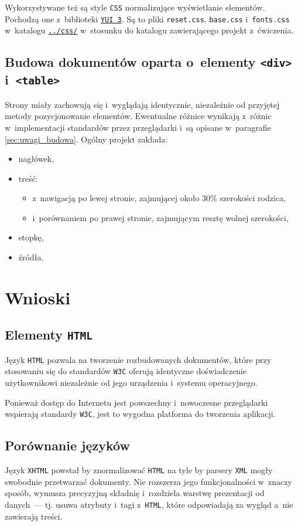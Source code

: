 \documentclass[10pt,a4paper]{article}
\newcommand{\f}[1]{\texttt{#1}}
\begin{document}
Wykorzystywane też są style \f{CSS} normalizujące wyświetlanie elementów.
Pochodzą one z~biblioteki \f{\href{http://yuilibrary.com/}{YUI 3}}. Są to pliki
\f{reset.css}, \f{base.css} i~\f{fonts.css} w~katalogu
\f{\href{https://github.com/student-tomasz/pi-laboratoria/tree/master/css}{../css/}}
w~stosunku do katalogu zawierającego projekt z~ćwiczenia.

\subsection{Budowa dokumentów oparta o~elementy \f{<div>} i~\f{<table>}}
Strony miały zachowują się i~wyglądają identycznie, niezależnie od przyjętej
metody pozycjonowanie elementów. Ewentualne różnice wynikają z~różnic
w~implementacji standardów przez przeglądarki i~są opisane w~paragrafie
\ref{sec:uwagi_budowa}. Ogólny projekt zakłada:
\begin{itemize}
  \item nagłówek,
  \item treść:
  \begin{itemize}
    \item z~nawigacją po lewej stronie, zajmującej około $30\%$ szerokości
      rodzica,
    \item i~porównaniem po prawej stronie, zajmującym resztę wolnej szerokości,
  \end{itemize}
  \item stopkę,
  \item źródła.
\end{itemize}



\section{Wnioski}
\subsection{Elementy \f{HTML}}
Język \f{HTML} pozwala na tworzenie rozbudowanych dokumentów, które przy
stosowaniu się do standardów \f{W3C} oferują identyczne doświadczenie
użytkownikowi niezależnie od jego urządzenia i~systemu operacyjnego.

Ponieważ dostęp do Internetu jest powszechny i~nowoczesne przeglądarki wspierają
standardy \f{W3C}, jest to wygodna platforma do tworzenia aplikacji.

\subsection{Porównanie języków}
Język \f{XHTML} powstał by znormalizować \f{HTML} na tyle by parsery \f{XML}
mogły swobodnie przetwarzać dokumenty. Nie rozszerza jego funkcjonalności
w~znaczy sposób, wymusza precyzyjną składnię i~rozdziela warstwę prezentacji
od danych~--- tj. usuwa atrybuty i~tagi z~\f{HTML}, które odpowiadają za wygląd
a~nie zawierają treści.
\end{document}
